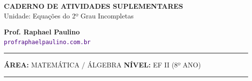 \documentclass[twoside, 10pt, a4paper]{article}
\begin{document}
\thispagestyle{empty}
\color{Cinzablack}
\vspace*{-1.8cm}

\noindent
\begin{minipage}{\textwidth}
    \selectfont
    \noindent
    \begin{minipage}[t]{0.70\linewidth}
        {\Large \bfseries \MakeUppercase{Caderno de Atividades Suplementares}}\\[0.1cm]
        {\large \textmd{\textcolor{CinzaEscuro}{Unidade: Equações do 2º Grau Incompletas}}}
    \end{minipage}%
    \begin{minipage}[t]{0.30\linewidth}
        \raggedleft
        \small \textbf{Prof. Raphael Paulino}\\
        \textsf{\small \textcolor{indigo}{\texttt{profraphaelpaulino.com.br}}}
    \end{minipage}
    
    \vspace{0.15cm}
    \noindent\rule{\linewidth}{1.2pt}
    \vspace{-0.1cm}
    \footnotesize\textsf{\textbf{ÁREA:} MATEMÁTICA / ÁLGEBRA \hfill \textbf{NÍVEL:} EF II (8º ANO)}
    \vspace{0.1cm}
    \noindent\rule{\linewidth}{0.4pt}
\end{minipage}
\end{document}
